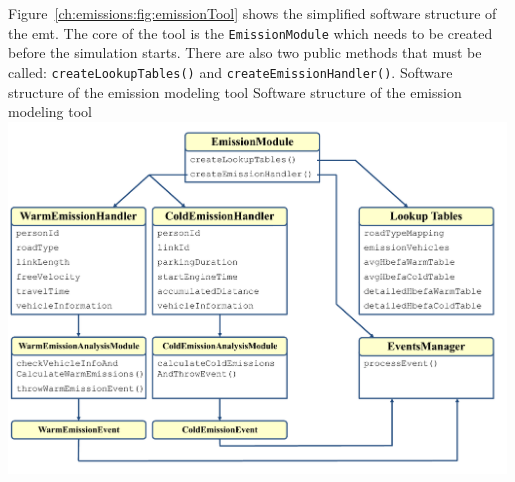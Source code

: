Figure~\ref{ch:emissions:fig:emissionTool} shows the simplified software structure of the \gls{emt}. The core of the tool is the \lstinline|EmissionModule| which needs to be created before the simulation starts. There are also two public methods that must be called: \lstinline|createLookupTables()| and \lstinline|createEmissionHandler()|.
%
\createfigure%
{Software structure of the emission modeling tool}%
{Software structure of the emission modeling tool}%
{\label{ch:emissions:fig:emissionTool}}%
{\includegraphics[width=0.99\textwidth, angle=0]{extending/figures/emissionToolOverview_pdfa.pdf}}%
{}

